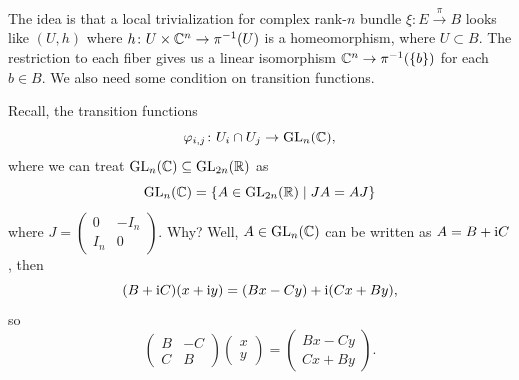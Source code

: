 

\begin{node}
The idea is that a local trivialization for complex rank-$n$ bundle
$\xi\colon E\xrightarrow{\pi}B$
looks like $(U,h)$ where $h\colon U\times\mathbb{C}^{n}\to\pi^{-1}(U)$ is a
homeomorphism, where $U\subset B$. The restriction to each fiber gives
us a linear isomorphism $\mathbb{C}^{n}\to\pi^{-1}(\{b\})$ for each $b\in B$.
We also need some condition on transition functions.
\end{node}

\begin{node}
Recall, the transition functions
\begin{equation}
\varphi_{i,j}\colon U_{i}\cap U_{j}\to\operatorname{GL}_{n}(\mathbb{C}),
\end{equation}
where we can treat $\operatorname{GL}_{n}(\mathbb{C})\subseteq\operatorname{GL}_{2n}(\mathbb{R})$ as
\begin{equation}
\operatorname{GL}_{n}(\mathbb{C})=\{A\in\operatorname{GL}_{2n}(\mathbb{R})\mid JA=AJ\}
\end{equation}
where $J=\begin{pmatrix}0 & -I_{n}\\ I_{n} & 0\end{pmatrix}$.
Why? Well, $A\in\operatorname{GL}_{n}(\mathbb{C})$ can be written as $A=B+\mathrm{i} C$, then
\begin{equation}
(B+\mathrm{i} C)(x+\mathrm{i} y)=(B x - Cy)+\mathrm{i}(Cx+By),
\end{equation}
so
\begin{equation}
  \begin{pmatrix}B & -C\\
    C & B
  \end{pmatrix}\begin{pmatrix}x\\y
  \end{pmatrix} = \begin{pmatrix}Bx-Cy\\ Cx+By
  \end{pmatrix}.
\end{equation}
\end{node}

